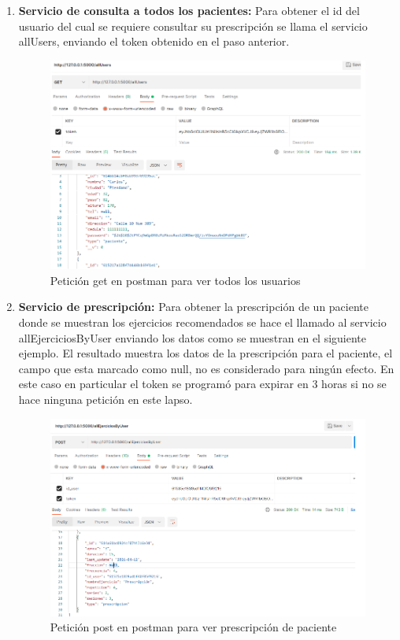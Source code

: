 \documentclass[12pt]{article}
\begin{document}
\begin{enumerate}
    \item \textbf{Servicio de consulta a todos los pacientes:} 
    Para obtener el id del usuario del cual se requiere consultar su prescripción se llama el servicio allUsers, enviando el token obtenido en el paso anterior.
    
            \begin{figure}[ht]
            \centering
            \includegraphics[scale=0.4]{imag/allus.png}
            \caption{Petición get en postman para ver todos los usuarios }
            \label{6}
            \end{figure}
            \FloatBarrier
            
    \item \textbf{Servicio de prescripción:}
    Para obtener la prescripción de un paciente donde se muestran los ejercicios recomendados se hace el llamado al servicio allEjerciciosByUser enviando los datos como se muestran en el siguiente ejemplo. El resultado muestra los datos de la prescripción para el paciente, el campo que esta marcado como null, no es considerado para ningún efecto. En este caso en particular el token se programó para expirar en 3 horas si no se hace ninguna petición en este lapso.
    
            \begin{figure}[ht]
            \centering
            \includegraphics[scale=0.4]{imag/prees.png}
            \caption{Petición post en postman para ver prescripción de paciente }
            \label{6}
            \end{figure}
            \FloatBarrier
            

\end{enumerate}
\end{document}
